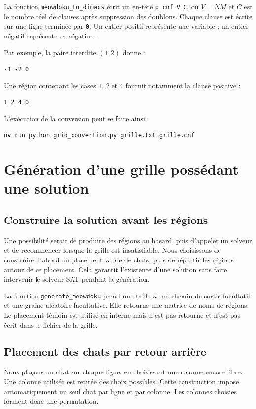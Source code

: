 \documentclass[11pt,a4paper]{article}
\begin{document}
La fonction \texttt{meowdoku\_to\_dimacs} écrit un en-tête
\texttt{p cnf V C}, où $V=NM$ et $C$ est le nombre réel de clauses après
suppression des doublons. Chaque clause est écrite sur une ligne terminée
par \texttt{0}. Un entier positif représente une variable ; un entier
négatif représente sa négation.

Par exemple, la paire interdite $(1,2)$ donne :
\begin{lstlisting}
-1 -2 0
\end{lstlisting}
Une région contenant les cases $1$, $2$ et $4$ fournit notamment la clause
positive :
\begin{lstlisting}
1 2 4 0
\end{lstlisting}
L'exécution de la conversion peut se faire ainsi :
\begin{lstlisting}
uv run python grid_convertion.py grille.txt grille.cnf
\end{lstlisting}

\section{Génération d'une grille possédant une solution}

\subsection{Construire la solution avant les régions}

Une possibilité serait de produire des régions au hasard, puis d'appeler
un solveur et de recommencer lorsque la grille est insatisfiable.
Nous choisissons de construire d'abord un placement valide de chats,
puis de répartir les régions autour de ce placement. Cela garantit
l'existence d'une solution sans faire intervenir le solveur SAT pendant
la génération.

La fonction \texttt{generate\_meowdoku} prend une taille $n$, un chemin
de sortie facultatif et une graine aléatoire facultative. Elle retourne
une matrice de noms de régions. Le placement témoin est utilisé en interne
mais n'est pas retourné et n'est pas écrit dans le fichier de la grille.

\subsection{Placement des chats par retour arrière}

Nous plaçons un chat sur chaque ligne, en choisissant une colonne encore
libre. Une colonne utilisée est retirée des choix possibles. Cette
construction impose automatiquement un seul chat par ligne et par colonne.
Les colonnes choisies forment donc une permutation.
\end{document}
